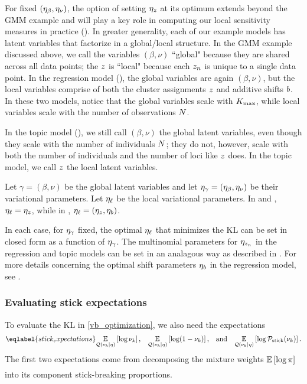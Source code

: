 For fixed $(\eta_{\beta}, \eta_{\nu})$, the option of setting $\eta_{z}$ at its optimum
extends beyond the GMM example and will play
a key role in computing our local sensitivity
measures in practice ().
In greater generality, each of our example models
has latent variables that factorize in a global/local structure.
In the GMM example discussed above, we call the variables $(\beta, \nu)$ ``global"
because they are shared across all data points; the $z$ is ``local"
because each $z_n$ is unique to a single data point.
In the regression model (),
the global variables are again $(\beta, \nu)$,
but the local variables comprise of both the cluster assignments $z$ and additive shifts $b$.
In these two models, notice that the global variables scale with ${K_{\mathrm{max}}}$, while
local variables scale with the number of observations $N$.

In the topic model (),
we still call $(\beta, \nu)$ the global latent variables, even though they scale
with the number of individuals $N$;
they do not, however, scale with both the number of individuals and the number of loci
like $z$ does. In the topic model, we call $z$ the local latent variables.

Let $\gamma = (\beta,\nu)$ be the global latent variables
and let $\eta_{\gamma} = (\eta_{\beta}, \eta_{\nu})$ be their variational parameters.
Let $\eta_{\ell}$ be the local variational parameters. In  and
, $\eta_{\ell} = \eta_{z}$, while
in , $\eta_{\ell} = (\eta_{z}, \eta_b)$.

In each case, for $\eta_{\gamma}$ fixed, the optimal $\eta_{\ell}$ that minimizes
the $\mathrm{KL}$ can be set in closed form as a function of $\eta_{\gamma}$.
The multinomial parameters for $\eta_{z_n}$ in the regression and topic models
can be set in an analagous way as described in .
For more details concerning the optimal shift parameters $\eta_b$
in the regression model, see .





\subsubsection{Evaluating stick expectations}

To evaluate the $\mathrm{KL}$ in \eqref{vb_optimization}, we also need
the expectations
\begin{align}\eqlabel{stick_expectations}
%
\expect{\q(\nuk \vert \eta)}{\log \nuk}
\textrm{,}\quad
\expect{\q(\nuk \vert \eta)}{\log (1 - \nuk)}
\textrm{,}\quad\textrm{and}\quad
\expect{\q(\nuk \vert \eta)}{\log \pstick(\nuk)}.
%
\end{align}
The first two expectations come from decomposing the mixture weights
$\underset{}{\mathbb{E}}\left[\log \pi\right]$ into its component stick-breaking proportions.

